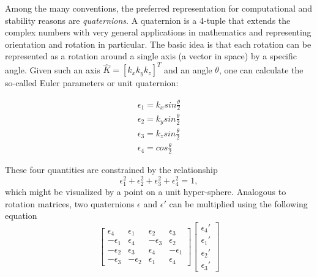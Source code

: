 Among the many conventions, the preferred representation for computational and stability reasons are \textsl{quaternions}.
A quaternion is a 4-tuple that extends the complex numbers with very general applications in mathematics and representing orientation and rotation in particular. The basic idea is that each rotation can be represented as a rotation around a single axis (a vector in space) by a specific angle. Given such an axis $ \hat{K}=[k_x k_y k_z]^T$ and an angle $ \theta$, one can calculate the so-called Euler parameters or unit quaternion:

\begin{eqnarray}
\epsilon_1=k_x sin \frac{\theta}{2}\\
\epsilon_2=k_y sin \frac{\theta}{2}\\
\epsilon_3=k_z sin \frac{\theta}{2}\\
\epsilon_4=cos\frac{\theta}{2}
\end{eqnarray}

These four quantities are constrained by the relationship
\begin{equation}
\epsilon_1^2+\epsilon_2^2+\epsilon_3^2+\epsilon_4^2=1,
\end{equation}
which might be visualized by a point on a unit hyper-sphere. %
Analogous to rotation matrices, two quaternions $\epsilon$ and $\epsilon'$ can be multiplied using the following equation
\begin{equation}
\left[
\begin{array}{cccc}
\epsilon_4 & \epsilon_1 & \epsilon_2 & \epsilon_3\\
-\epsilon_1 & \epsilon_4 & -\epsilon_3 & \epsilon_2\\
-\epsilon_2 & \epsilon_3 & \epsilon_4 & -\epsilon_1\\
-\epsilon_3 & -\epsilon_2 & \epsilon_1 & \epsilon_4
\end{array}
\right]
\left[\begin{array}{c}\epsilon_4'\\\epsilon_1'\\\epsilon_2'\\\epsilon_3'\end{array}\right]
\end{equation}

